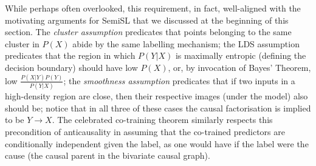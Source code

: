 While perhaps often overlooked, this requirement, in fact, well-aligned with the motivating
arguments for \ac{SemiSL} that we discussed at the beginning of this section.
%
The \emph{cluster assumption} predicates that points belonging to the same cluster in \(P(X)\)
abide by the same labelling mechanism; 
%
the LDS assumption predicates that the region in which \(P(Y|X)\) is maximally entropic (defining
the decision boundary) should have low \(P(X)\), or, by invocation of Bayes' Theorem, low \( \frac{
P(X|Y)P(Y) }{ P(Y|X) } \); 
%
the \emph{smoothness assumption} predicates that if two inputs in a high-density region are close,
then their respective images (under the model) also should be;
%
notice that in all three of these cases the causal factorisation is implied to be \(Y \to X \).
%
The celebrated co-training theorem \citep{blum1998combining} similarly respects this precondition
of anticausality in assuming that the co-trained predictors are conditionally independent given the
label, as one would have if the label were the cause (the causal parent in the bivariate causal
graph).
%

